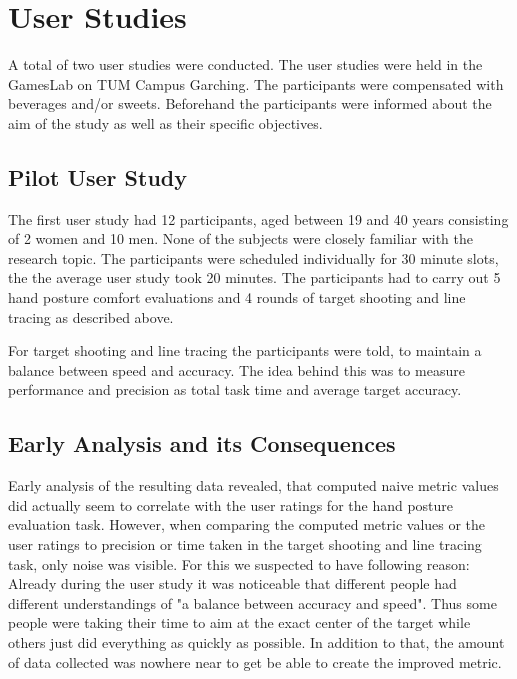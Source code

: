 \chapter{User Studies}\label{chapter:userstudy}

A total of two user studies were conducted. The user studies were held in the GamesLab on TUM Campus Garching. The participants were compensated with beverages and/or sweets. Beforehand the participants were informed about the aim of the study as well as their specific objectives. 

\section{Pilot User Study}

The first user study had 12 participants, aged between 19 and 40 years consisting of 2 women and 10 men. None of the subjects were closely familiar with the research topic. The participants were scheduled individually for 30 minute slots, the the average user study took 20 minutes.
The participants had to carry out 5 hand posture comfort evaluations and 4 rounds of target shooting and line tracing as described above. 

For target shooting and line tracing the participants were told, to maintain a balance between speed and accuracy. The idea behind this was to measure performance and precision as total task time and average target accuracy. 

\section{Early Analysis and its Consequences}

Early analysis of the resulting data revealed, that computed naive metric values did actually seem to correlate with the user ratings for the hand posture evaluation task. However, when comparing the computed metric values or the user ratings to precision or time taken in the target shooting and line tracing task, only noise was visible. 
For this we suspected to have following reason: Already during the user study it was noticeable that different people had different understandings of "a balance between accuracy and speed". Thus some people were taking their time to aim at the exact center of the target while others just did everything as quickly as possible.
In addition to that, the amount of data collected was nowhere near to get be able to create the improved metric.

